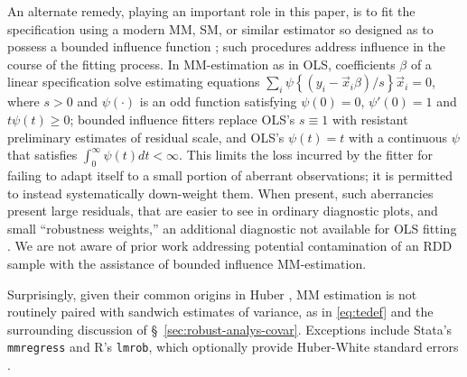  An alternate remedy, playing
 an important role in this paper, is to fit the
 specification using a modern MM,  SM, or similar estimator so designed
 as to possess a bounded influence function
 \citep{yohaiZamar1997locallyrobustMestimates}; such procedures address influence
 in the course of the fitting process.
In MM-estimation as in OLS,
coefficients $\beta$ of a linear specification solve estimating equations
$\sum_{i} \psi\left\{ ({y}_{i} -
\vec{x}_{i}\beta)/s \right\} \vec{x}_{i} =0$, where $s>0$ and
$\psi(\cdot)$ is an odd function satisfying $\psi(0)=0$,
$\psi'(0)=1$ and $t\psi(t)\geq 0$; bounded influence fitters replace OLS's $s\equiv 1$ with resistant preliminary
estimates of residual scale, and OLS's $\psi(t) = t$ with a continuous $\psi$
that satisfies $\int_{0}^{\infty}\psi(t)dt < \infty$. This limits
the loss incurred by the fitter for failing to adapt itself to a small
portion of aberrant observations;
it is permitted to instead systematically down-weight them. When
present, such aberrancies present large residuals, that are easier to
see in ordinary diagnostic plots, and small
``robustness weights,'' an additional diagnostic not available for OLS fitting
\citep{maronna2006robust}.  We are not aware of prior work addressing
potential contamination of an RDD sample with the assistance of
bounded influence MM-estimation.

Surprisingly, given their common origins in %
Huber \citeyearpar{huber1964robust}, MM estimation is not routinely
paired with sandwich estimates of variance, as in \eqref{eq:tedef} and
the surrounding discussion of \S~\ref{sec:robust-analys-covar}.
Exceptions include Stata's \texttt{mmregress} and R's \texttt{lmrob},
which optionally provide Huber-White standard errors
\citep{verardiCroux2009robust,rousseuwetal2015robustbase}.


